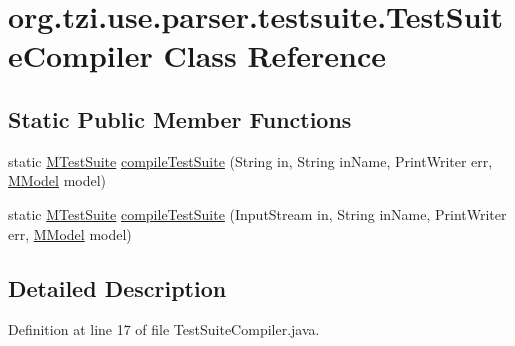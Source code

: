 \hypertarget{classorg_1_1tzi_1_1use_1_1parser_1_1testsuite_1_1_test_suite_compiler}{\section{org.\-tzi.\-use.\-parser.\-testsuite.\-Test\-Suite\-Compiler Class Reference}
\label{classorg_1_1tzi_1_1use_1_1parser_1_1testsuite_1_1_test_suite_compiler}
}
\subsection*{Static Public Member Functions}
\begin{DoxyCompactItemize}
\item 
static \hyperlink{classorg_1_1tzi_1_1use_1_1uml_1_1sys_1_1testsuite_1_1_m_test_suite}{M\-Test\-Suite} \hyperlink{classorg_1_1tzi_1_1use_1_1parser_1_1testsuite_1_1_test_suite_compiler_aa7a0329e5cbd35dfc8e83d3d5d9540b9}{compile\-Test\-Suite} (String in, String in\-Name, Print\-Writer err, \hyperlink{classorg_1_1tzi_1_1use_1_1uml_1_1mm_1_1_m_model}{M\-Model} model)
\item 
static \hyperlink{classorg_1_1tzi_1_1use_1_1uml_1_1sys_1_1testsuite_1_1_m_test_suite}{M\-Test\-Suite} \hyperlink{classorg_1_1tzi_1_1use_1_1parser_1_1testsuite_1_1_test_suite_compiler_a7e5bf1329886c66c89dc9bb810c680a6}{compile\-Test\-Suite} (Input\-Stream in, String in\-Name, Print\-Writer err, \hyperlink{classorg_1_1tzi_1_1use_1_1uml_1_1mm_1_1_m_model}{M\-Model} model)
\end{DoxyCompactItemize}


\subsection{Detailed Description}


Definition at line 17 of file Test\-Suite\-Compiler.\-java.



